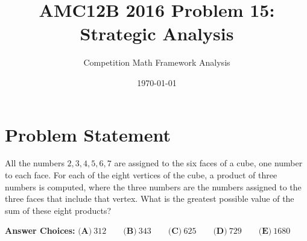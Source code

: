 \documentclass[]{article}
\begin{document}
\title{AMC12B 2016 Problem 15: Strategic Analysis}
\author{Competition Math Framework Analysis}
\date{\today}
\maketitle

\section*{Problem Statement}
All the numbers $2, 3, 4, 5, 6, 7$ are assigned to the six faces of a cube, one number to each face. For each of the eight vertices of the cube, a product of three numbers is computed, where the three numbers are the numbers assigned to the three faces that include that vertex. What is the greatest possible value of the sum of these eight products?

\textbf{Answer Choices:}
$\textbf{(A)}\ 312 \qquad \textbf{(B)}\ 343 \qquad \textbf{(C)}\ 625 \qquad \textbf{(D)}\ 729 \qquad \textbf{(E)}\ 1680$
\end{document}
